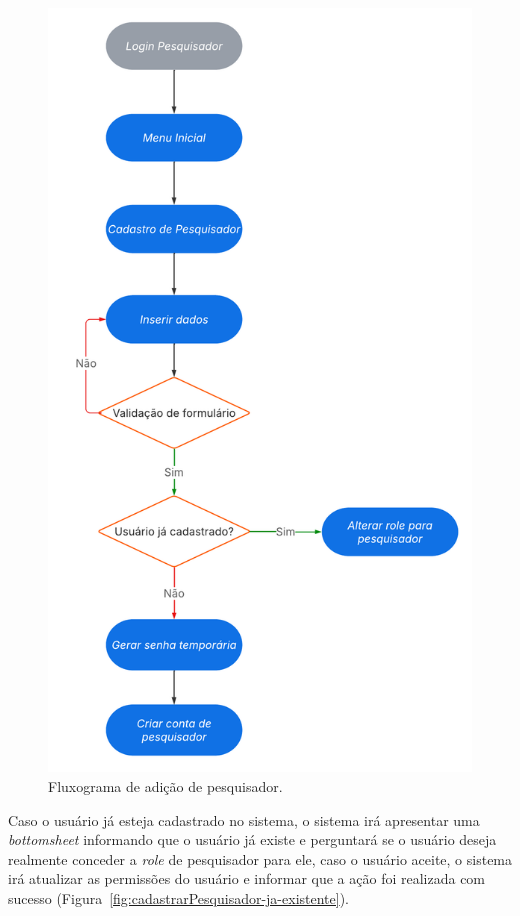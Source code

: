 \begin{figure}[H]
    \centering
    \includegraphics[height=0.90\textheight]{diagrams/fluxograma_adicionar_pesq.pdf}
    \caption{Fluxograma de adição de pesquisador.}
    \label{fig:fluxo-adicionar-pesquisador}
\end{figure}

Caso o usuário já esteja cadastrado no sistema, o sistema irá apresentar uma \textit{bottomsheet} informando 
que o usuário já existe e perguntará se o usuário deseja realmente conceder a \textit{role} de pesquisador para ele, caso o usuário aceite,
o sistema irá atualizar as permissões do usuário e informar que a ação foi realizada com sucesso 
(Figura~\ref{fig:cadastrarPesquisador-ja-existente}).

